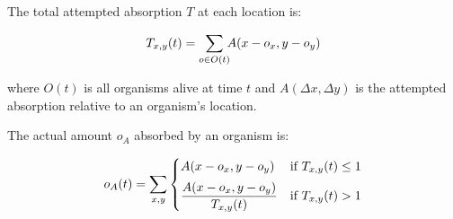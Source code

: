 \documentclass{article}
\begin{document}

\begin{comment}
Selective pressure can favor a gene for altruistic behavior even in a
community of takers who give nothing back, even when the behavior results in
the giver having no offspring, even when there is no mechanism to detect or
punish takers who give nothing back, and even when givers must compete with
their own beneficiaries for the resources needed for giving. Three conditions
suffice to produce this selective pressure: (1) the gene encodes only a
probability of engaging in the giving behavior; (2) benefits from the behavior
decrease with distance from the giver; and (3) organisms can produce more than
one offspring. A population under these conditions tends to contain a stable
range of variation in alleles that code for different probabilities of the
giving behavior, in some cases producing castes centered at different
probabilities. In effect, alleles for varying degrees of giving produce
partial clones who are partially sterile in proportion to their giving. Such
alleles represent a range of variation between the sterile castes of social
insects, or somatic cells in multicellular organisms (100\% clones, 100\%
givers, 100\% sterile), and organisms that try to maximize inclusive fitness
entirely through their own offspring. The selective pressure favoring partial
givers provides a genetic explanation for some forms of group selection, and
predicts as-yet-unexplored correlations between communal giving and sterility.

\end{comment}

The total attempted absorption $T$ at each location is:

$$
T_{x,y}(t) = \sum\limits_{o \in O(t)} \kern-4pt A(x - o_x, y - o_y)
$$

\noindent
where $O(t)$ is all organisms alive at time $t$ and $A(\Delta x, \Delta y)$
is the attempted absorption relative to an organism's location.

The actual amount $o_A$ absorbed by an organism is:

$$
o_A(t) = \sum\limits_{x,y} \begin{cases}
A(x - o_x, y - o_y)  &  \mbox{if }T_{x,y}(t) \leq 1  \\
\noalign{\vskip 0.5em}
\dfrac{A(x - o_x, y - o_y)}{T_{x,y}(t)}  & \mbox{if }T_{x,y}(t) > 1
\end{cases}
$$
\end{document}
